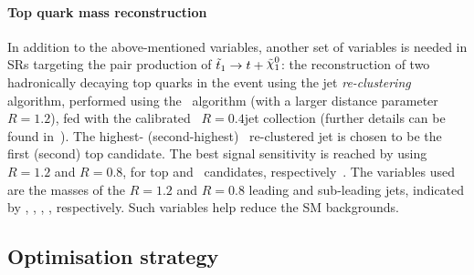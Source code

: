 			\paragraph*{Top quark mass reconstruction}

				In addition to the above-mentioned variables, another set of variables is needed in \acp{SR} targeting the pair production of $\stopone \to t + \ninoone$: the reconstruction of two hadronically decaying top quarks in the event using the jet \emph{re-clustering} algorithm, performed using the \antikt\ algorithm (with a larger distance parameter $R = 1.2$), fed with the calibrated \antikt\ $R = 0.4 $jet collection (further details can be found in~\cite{Antikt2008}). The highest- (second-highest) \pt\ re-clustered jet is chosen to be the first (second) top candidate. The best signal sensitivity is reached by using $R = 1.2$ and $R = 0.8$, for top and \Wboson\ candidates, respectively~\cite{stop0L,ICHEPstop0L}. The variables used are the masses of the $R=1.2$ and $R=0.8$ leading and sub-leading jets, indicated by \mantikttwelvezero, \mantikttwelveone, \mantikteightzero, \mantikteightone, respectively. Such variables help reduce the \ac{SM} backgrounds. %

		\subsection{Optimisation strategy}


